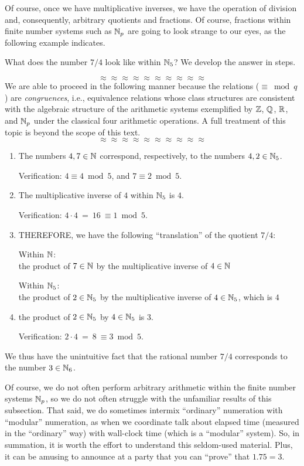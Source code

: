 \medskip

Of course, once we have multiplicative inverses, we have the operation
of division and, consequently, arbitrary quotients and fractions.  Of
course, fractions within finite number systems such as $\mathbb{N}_p$ are
going to look strange to our eyes, as the following example indicates.

What does the number $7/4$ look like within $\mathbb{N}_5$?  We develop the
answer in steps.

\[ \approx \approx \approx \approx \approx \approx \approx \approx \approx \approx \]
We are able to proceed in the following manner because the relations
($\equiv \bmod q$) are {\em congruences}, 
i.e., equivalence relations whose class structures are consistent with
the algebraic structure of the arithmetic systems exemplified by $\mathbb{Z}$,
$\mathbb{Q}$, $\mathbb{R}$, and $\mathbb{N}_p$ under the classical four arithmetic operations.
A full treatment of this topic is beyond the scope of this text.
\[ \approx \approx \approx \approx \approx \approx \approx \approx \approx \approx \]
\begin{enumerate}
\item
The numbers $4, 7 \in \mathbb{N}$ correspond, respectively, to the numbers $4,
2 \in \mathbb{N}_5$.

Verification:
$4 \equiv 4 \bmod 5$, and $7 \equiv 2 \bmod 5$.

\item
The multiplicative inverse of $4$ within $\mathbb{N}_5$ is $4$.

Verification:
$4 \cdot 4 \ = \ 16 \ \equiv 1 \bmod 5$.

\item
THEREFORE, we have the following ``translation'' of the quotient $7/4$:

Within $\mathbb{N}$: \\
the product of $7 \in \mathbb{N}$ by the multiplicative inverse of $4 \in \mathbb{N}$

Within $\mathbb{N}_5$: \\
the product of $2 \in \mathbb{N}_5$ by the multiplicative inverse of $4 \in
\mathbb{N}_5$, which is $4$

\item
the product of $2 \in \mathbb{N}_5$ by $4 \in \mathbb{N}_5$ is $3$.

Verification:
$2 \cdot 4 \ = \ 8 \ \equiv 3 \bmod 5$.
\end{enumerate}
We thus have the unintuitive fact that the rational number $7/4$
corresponds to the number $3 \in \mathbb{N}_6$.

Of course, we do not often perform arbitrary arithmetic within the
finite number systems $\mathbb{N}_p$, so we do not often struggle with the
unfamiliar results of this subsection.  That said, we do sometimes
intermix ``ordinary'' numeration with ``modular'' numeration, as when
we coordinate talk about elapsed time (measured in the ``ordinary''
way) with wall-clock time (which is a ``modular'' system).  So, in
summation, it is worth the effort to understand this seldom-used
material.  Plus, it can be amusing to announce at a party that you can
``prove'' that $1.75 = 3$.


